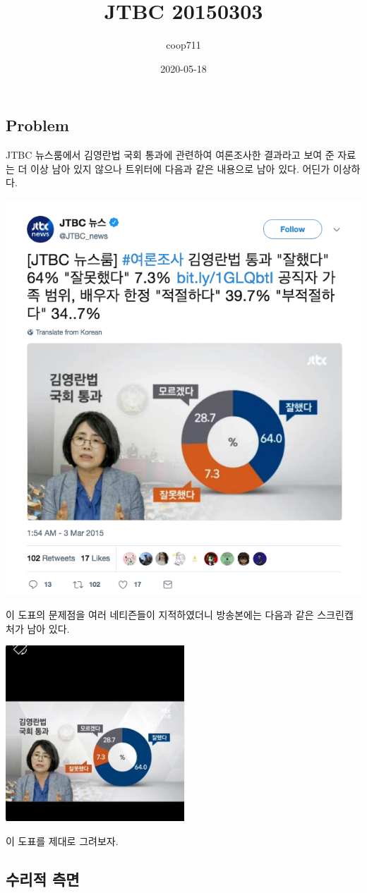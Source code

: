 \documentclass[
]{article}
\title{JTBC 20150303}
\author{coop711}
\date{2020-05-18}
\begin{document}
\maketitle

\hypertarget{problem}{%
\subsection{Problem}\label{problem}}

JTBC 뉴스룸에서 김영란법 국회 통과에 관련하여 여론조사한 결과라고 보여
준 자료는 더 이상 남아 있지 않으나 트위터에 다음과 같은 내용으로 남아
있다. 어딘가 이상하다.

\begin{center}\includegraphics[width=0.5\linewidth]{../pics/JTBC_20150303} \end{center}

이 도표의 문제점을 여러 네티즌들이 지적하였더니 방송본에는 다음과 같은
스크린캡처가 남아 있다.

\begin{center}\includegraphics[width=0.45\linewidth]{../pics/JTBC_20150303v2} \end{center}

이 도표를 제대로 그려보자.

\hypertarget{uxc218uxb9acuxc801-uxce21uxba74}{%
\subsection{수리적 측면}\label{uxc218uxb9acuxc801-uxce21uxba74}}
\end{document}
